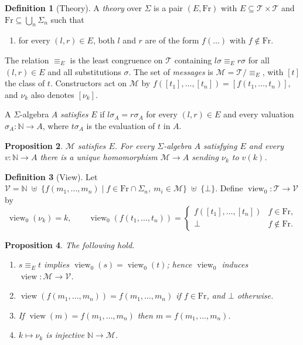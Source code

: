 \documentclass[11pt]{article}
\theoremstyle{definition}
\newtheorem{definition}{Definition}[section]
\theoremstyle{plain}
\newtheorem{proposition}[definition]{Proposition}
\theoremstyle{remark}
\newcommand{\N}{\mathbb{N}}
\newcommand{\Terms}{\mathcal{T}}
\newcommand{\Msg}{\mathcal{M}}
\newcommand{\Fr}{\mathrm{Fr}}
\newcommand{\eqE}{\equiv_{E}}
\newcommand{\View}{\mathcal{V}}
\newcommand{\view}{\operatorname{view}}
\begin{document}
\begin{definition}[Theory]
A \emph{theory} over $\Sigma$ is a pair $(E,\Fr)$ with $E\subseteq\Terms\times\Terms$ and $\Fr\subseteq\bigcup_n\Sigma_n$ such that
\begin{enumerate}
\item[(H)] for every $(l,r)\in E$, both $l$ and $r$ are of the form $f(\dots)$ with $f\notin\Fr$.
\end{enumerate}
The relation $\eqE$ is the least congruence on $\Terms$ containing $l\sigma\eqE r\sigma$ for all $(l,r)\in E$ and all substitutions $\sigma$. The set of \emph{messages} is $\Msg=\Terms/{\eqE}$, with $[t]$ the class of $t$. Constructors act on $\Msg$ by $f([t_1],\dots,[t_n])=[f(t_1,\dots,t_n)]$, and $\nu_k$ also denotes $[\nu_k]$.
\end{definition}

A $\Sigma$-algebra $A$ \emph{satisfies} $E$ if $l\sigma_A=r\sigma_A$ for every $(l,r)\in E$ and every valuation $\sigma_A:\N\to A$, where $t\sigma_A$ is the evaluation of $t$ in $A$.

\begin{proposition}
$\Msg$ satisfies $E$. For every $\Sigma$-algebra $A$ satisfying $E$ and every $v:\N\to A$ there is a unique homomorphism $\Msg\to A$ sending $\nu_k$ to $v(k)$.
\end{proposition}

\begin{definition}[View]
Let $\View=\N\;\uplus\;\{f(m_1,\dots,m_n)\mid f\in\Fr\cap\Sigma_n,\ m_i\in\Msg\}\;\uplus\;\{\bot\}$. Define $\view_0:\Terms\to\View$ by
\[
\view_0(\nu_k)=k,\qquad
\view_0(f(t_1,\dots,t_n))=
\begin{cases}
f([t_1],\dots,[t_n]) & f\in\Fr,\\
\bot & f\notin\Fr.
\end{cases}
\]
\end{definition}

\begin{proposition}\label{prop:view}
The following hold.
\begin{enumerate}
\item $s\eqE t$ implies $\view_0(s)=\view_0(t)$; hence $\view_0$ induces $\view:\Msg\to\View$.
\item $\view(f(m_1,\dots,m_n))=f(m_1,\dots,m_n)$ if $f\in\Fr$, and $\bot$ otherwise.
\item If $\view(m)=f(m_1,\dots,m_n)$ then $m=f(m_1,\dots,m_n)$.
\item $k\mapsto\nu_k$ is injective $\N\to\Msg$.
\end{enumerate}
\end{proposition}
\end{document}

